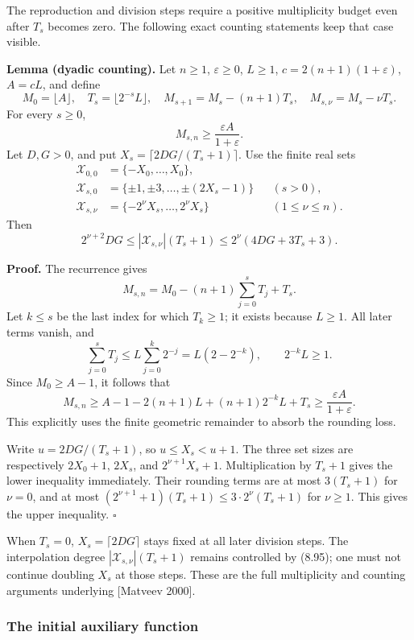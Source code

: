 \documentclass[
  11pt,
  a4paper,
]{article}
\begin{document}
The reproduction and division steps require a positive multiplicity
budget even after \(T_s\) becomes zero. The following exact counting
statements keep that case visible.

\textbf{Lemma (dyadic counting).} Let \(n\ge1\), \(\varepsilon\ge0\),
\(L\ge1\), \(c=2(n+1)(1+\varepsilon)\), \(A=cL\), and define \[
M_0=\lfloor A\rfloor,\quad T_s=\lfloor2^{-s}L\rfloor,\quad
M_{s+1}=M_s-(n+1)T_s,\quad M_{s,\nu}=M_s-\nu T_s.
\] For every \(s\ge0\), \[
M_{s,n}\ge\frac{\varepsilon A}{1+\varepsilon}.
\tag{8.94}
\] Let \(D,G>0\), and put \(X_s=\lceil2DG/(T_s+1)\rceil\). Use the
finite real sets \[
\begin{aligned}
\mathcal X_{0,0}&=\{-X_0,\ldots,X_0\},\\
\mathcal X_{s,0}&=\{\pm1,\pm3,\ldots,\pm(2X_s-1)\}
&& (s>0),\\
\mathcal X_{s,\nu}&=\{-2^\nu X_s,\ldots,2^\nu X_s\}
&& (1\le\nu\le n).
\end{aligned}
\] Then \[
2^{\nu+2}DG
\le|\mathcal X_{s,\nu}|(T_s+1)
\le2^\nu(4DG+3T_s+3).
\tag{8.95}
\]

\textbf{Proof.} The recurrence gives \[
M_{s,n}=M_0-(n+1)\sum_{j=0}^sT_j+T_s.
\] Let \(k\le s\) be the last index for which \(T_k\ge1\); it exists
because \(L\ge1\). All later terms vanish, and \[
\sum_{j=0}^sT_j
\le L\sum_{j=0}^k2^{-j}=L(2-2^{-k}),\qquad
2^{-k}L\ge1.
\] Since \(M_0\ge A-1\), it follows that \[
M_{s,n}\ge A-1-2(n+1)L+(n+1)2^{-k}L+T_s
\ge\frac{\varepsilon A}{1+\varepsilon}.
\] This explicitly uses the finite geometric remainder to absorb the
rounding loss.

Write \(u=2DG/(T_s+1)\), so \(u\le X_s<u+1\). The three set sizes are
respectively \(2X_0+1\), \(2X_s\), and \(2^{\nu+1}X_s+1\).
Multiplication by \(T_s+1\) gives the lower inequality immediately.
Their rounding terms are at most \(3(T_s+1)\) for \(\nu=0\), and at most
\((2^{\nu+1}+1)(T_s+1)\le3\cdot2^\nu(T_s+1)\) for \(\nu\ge1\). This
gives the upper inequality. \(\square\)

When \(T_s=0\), \(X_s=\lceil2DG\rceil\) stays fixed at all later
division steps. The interpolation degree \(|\mathcal X_{s,\nu}|(T_s+1)\)
remains controlled by (8.95); one must not continue doubling \(X_s\) at
those steps. These are the full multiplicity and counting arguments
underlying {[}Matveev 2000{]}.

\subsubsection{The initial auxiliary
function}\label{the-initial-auxiliary-function}
\end{document}
